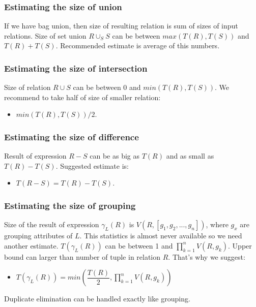 \subsubsection{Estimating the size of union}

If we have bag union, then size of resulting relation is sum of sizes of input relations. Size of set union $R \cup_S S$ can be between $max(T(R),T(S))$ and $T(R)+T(S)$. Recommended estimate is average of this numbers. 

\subsubsection{Estimating the size of intersection}
Size of relation $R\cup S$ can be between $0$ and $min(T(R),T(S))$. We recommend to take half of size of smaller relation:
\begin{itemize}
\item  $min(T(R),T(S))/2$.
\end{itemize}

\subsubsection{Estimating the size of difference}

Result of expression $R-S$ can be as big as $T(R)$ and as small as $T(R)-T(S)$. Suggested estimate is: 
\begin{itemize}
\item  $T(R-S)=T(R)-T(S)$.
\end{itemize}
\subsubsection{Estimating the size of grouping}
Size of the result of expression $\gamma_L(R)$ is $V(R,[g_1,g_2,...,g_n])$, where $g_x$ are grouping attributes of $L$. This statistics is almost never available so we need another estimate. $T(\gamma_L(R))$ can be between 1 and $\prod_{k=1}^{n}{V(R,g_k)}$. Upper bound can larger than number of tuple in relation $R$. That's why we suggest:
\begin{itemize}
\item $T(\gamma_L(R))=min(\dfrac{T(R)}{2},\prod_{k=1}^{n}{V(R,g_k)})$
\end{itemize}
Duplicate elimination can be handled exactly like grouping.

